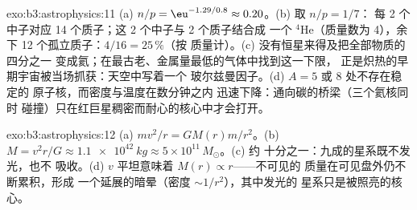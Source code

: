 \begin{solution}{exo:b3:astrophysics:11}
(a) $n/p = \eu^{-1.29/0.8} \approx 0.20$。(b) 取 $n/p = 1/7$：
每 2 个中子对应 14 个质子；这 2 个中子与 2 个质子结合成
一个 $^4$He（质量数为 4），余下 12 个孤立质子：$4/16 = 25\,\%$（按
质量计）。(c) 没有恒星来得及把全部物质的四分之一
变成氦；在最古老、金属量最低的气体中找到这一下限，
正是炽热的早期宇宙被当场抓获：天空中写着一个
玻尔兹曼因子。(d) $A = 5$ 或 $8$ 处不存在稳定的
原子核，而密度与温度在数分钟之内
迅速下降：通向碳的桥梁（三个氦核同时
碰撞）只在红巨星稠密而耐心的核心中才会打开。
\end{solution}

\begin{solution}{exo:b3:astrophysics:12}
(a) $mv^2/r = GM(r)m/r^2$。(b) $M = v^2r/G \approx
\qty{1.1e42}{kg} \approx 5\times10^{11}\,M_\odot$。(c) 约
十分之一：九成的星系既不发光，也不
吸收。(d) $v$ 平坦意味着 $M(r) \propto r$——不可见的
质量在可见盘外仍不断累积，形成
一个延展的暗晕（密度 $\sim1/r^2$），其中发光的
星系只是被照亮的核心。
\end{solution}

